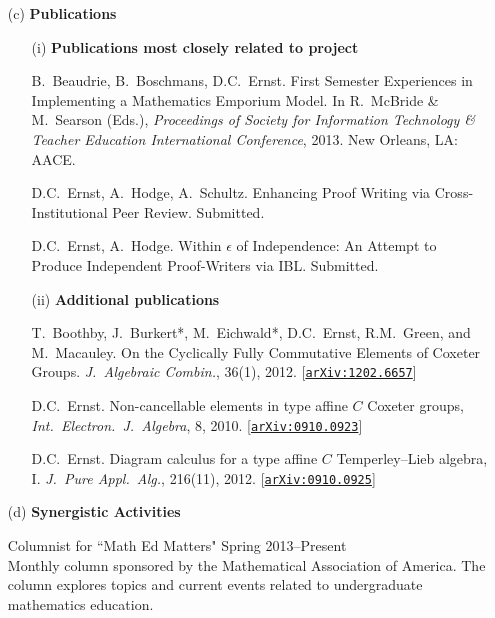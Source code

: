 \documentclass[11pt]{article}
\begin{document}
\begin{enumerate}[leftmargin=*]
\item[(c)] \textbf{Publications}

\begin{enumerate}[leftmargin=\parindent]
\item[(i)] \textbf{Publications most closely related to project}

B.~Beaudrie, B.~Boschmans, D.C.~Ernst. First Semester Experiences in Implementing a Mathematics Emporium Model. In R.~McBride \& M.~Searson (Eds.), \emph{Proceedings of Society for Information Technology \& Teacher Education International Conference}, 2013.  New Orleans, LA: AACE.

\smallskip

D.C.~Ernst, A.~Hodge, A.~Schultz.  Enhancing Proof Writing via Cross-Institutional Peer Review. Submitted.

\smallskip

D.C.~Ernst, A.~Hodge. Within $\epsilon$ of Independence: An Attempt to Produce Independent Proof-Writers via IBL. Submitted.
 
\item[(ii)] \textbf{Additional publications}

T.~Boothby, J.~Burkert*, M.~Eichwald*, D.C.~Ernst, R.M.~Green, and M.~Macauley. On the Cyclically Fully Commutative Elements of Coxeter Groups.  \emph{J.~Algebraic Combin.}, 36(1), 2012.  [\href{http://arxiv.org/abs/1202.6657}{\texttt{arXiv:1202.6657}}]

\smallskip

\noindent D.C.~Ernst.  Non-cancellable elements in type affine $C$ Coxeter groups,  \emph{Int.~Electron.~J.~Algebra}, 8, 2010.  [\href{http://arxiv.org/abs/0910.0923}{\texttt{arXiv:0910.0923}}]

\smallskip

D.C.~Ernst.  Diagram calculus for a type affine $C$ Temperley--Lieb algebra, I. \emph{J.~Pure Appl.~Alg.}, 216(11), 2012. [\href{http://arxiv.org/abs/0910.0925}{\texttt{arXiv:0910.0925}}]
\end{enumerate}
 
\item[(d)] \textbf{Synergistic Activities}

Columnist for ``Math Ed Matters" \hfill Spring 2013--Present\\
Monthly column sponsored by the Mathematical Association of America. The column explores topics and current events related to undergraduate mathematics education. 

\smallskip


\end{enumerate}
\end{document}
